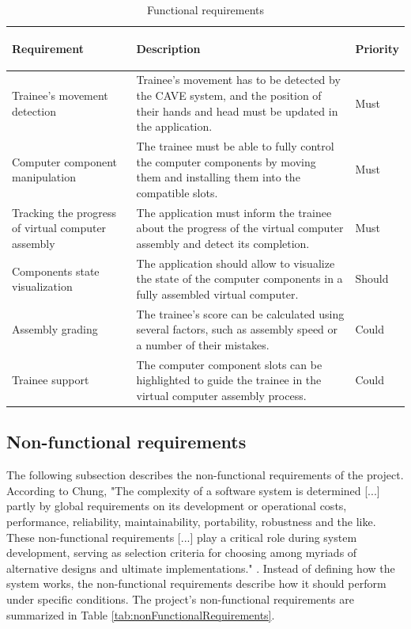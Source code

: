 \begin{table}[!ht]
\caption{Functional requirements}
\label{tab:functionalRequirements}

\small
\begin{tabular}{|p{}|p{}|p{}|}
\hline

   \begin{center}
       \textbf{Requirement}
   \end{center}  
   &
   \begin{center}
       \textbf{Description}
   \end{center}
   &
   \begin{center}
       \textbf{Priority}
   \end{center}
   \\\hline
    Trainee's movement detection
    & Trainee's movement has to be detected by the CAVE system, and the position of their hands and head must be updated in the application.
    & Must
    \\\hline
    Computer component manipulation
    & The trainee must be able to fully control the computer components by moving them and installing them into the compatible slots.
    & Must
     \\\hline %
    Tracking the progress of virtual computer assembly
    & The application must inform the trainee about the progress of the virtual computer assembly and detect its completion.
    & Must
    \\\hline %
    Components state visualization
    & The application should allow to visualize the state of the computer components in a fully assembled virtual computer.
    & Should
    \\\hline %
    Assembly grading
    & The trainee's score can be calculated using several factors, such as assembly speed or a number of their mistakes.
    & Could
    \\\hline %
    Trainee support
    & The computer component slots can be highlighted to guide the trainee in the virtual computer assembly process.
    & Could
    \\\hline
\end{tabular}
\end{table}

\subsection{Non-functional requirements}
The following subsection describes the non-functional requirements of the project.
According to Chung, "The complexity of a software system is determined [...] partly by global requirements on its development or operational costs, performance, reliability, maintainability, portability, robustness and the like.
These non-functional requirements [...] play a critical role during system development, serving as selection criteria for choosing among myriads of alternative designs and ultimate implementations." \cite{NonFunctionalRequirements}.
Instead of defining how the system works, the non-functional requirements describe how it should perform under specific conditions.
The project's non-functional requirements are summarized in Table \ref{tab:nonFunctionalRequirements}.

